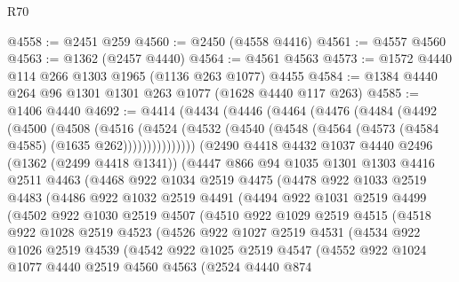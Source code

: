 \begin{lexlean}{R70}
\begin{coremodule}
@4558 := @2451 @259
@4560 := @2450 (@4558 @4416)
@4561 := @4557 @4560
@4563 := @1362 (@2457 @4440)
@4564 := @4561 @4563
@4573 := @1572 @4440 @114 @266 @1303 @1965 (@1136 @263 @1077) @4455
@4584 := @1384 @4440 @264 @96 @1301 @1301 @263 @1077 (@1628 @4440 @117 @263)
@4585 := @1406 @4440
@4692 := @4414
    (@4434
      (@4446
        (@4464
          (@4476
            (@4484
              (@4492
                (@4500
                  (@4508
                    (@4516
                      (@4524
                        (@4532 (@4540 (@4548 (@4564 (@4573 (@4584 @4585) (@1635 @262)))))))))))))))
      (@2490
        @4418
        @4432
        @1037
        @4440
        @2496
        (@1362 (@2499 @4418 @1341))
        (@4447
          @866
          @94
          @1035
          @1301
          @1303
          @4416
          @2511
          @4463
          (@4468
            @922
            @1034
            @2519
            @4475
            (@4478
              @922
              @1033
              @2519
              @4483
              (@4486
                @922
                @1032
                @2519
                @4491
                (@4494
                  @922
                  @1031
                  @2519
                  @4499
                  (@4502
                    @922
                    @1030
                    @2519
                    @4507
                    (@4510
                      @922
                      @1029
                      @2519
                      @4515
                      (@4518
                        @922
                        @1028
                        @2519
                        @4523
                        (@4526
                          @922
                          @1027
                          @2519
                          @4531
                          (@4534
                            @922
                            @1026
                            @2519
                            @4539
                            (@4542
                              @922
                              @1025
                              @2519
                              @4547
                              (@4552
                                @922
                                @1024
                                @1077
                                @4440
                                @2519
                                @4560
                                @4563
                                (@2524
                                  @4440
                                  @874

\end{coremodule}
\end{lexlean}
